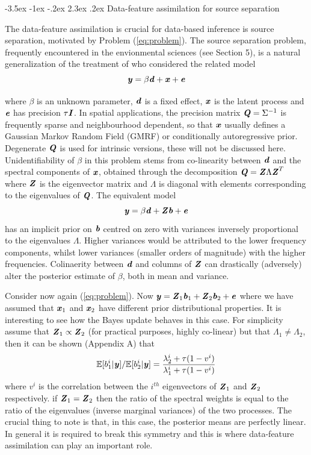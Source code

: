 \documentclass[10pt,a4paper]{article}
\makeatletter
\newcommand{\expect} {{\mathbb{E}}}
\newcommand{\Qmat} {\textbf{\textit{Q}}}
\newcommand{\Zmat} {\textbf{\textit{Z}}}
\newcommand{\Imat} {\textbf{\textit{I}}}
\newcommand{\bvec} {\textbf{\textit{b}}}
\newcommand{\dvec} {\textbf{\textit{d}}}
\newcommand{\evec} {\textbf{\textit{e}}}
\newcommand{\xvec} {\textbf{\textit{x}}}
\newcommand{\yvec} {\textbf{\textit{y}}}
\renewcommand\section{\@startsection{section}{1}{\z@}%
                                  {-3.5ex \@plus -1ex \@minus -.2ex}%
                                  {2.3ex \@plus.2ex}%
                                  {\normalfont\large\bfseries}}
\makeatother
\begin{document}
\section{Data-feature assimilation for source separation}

The data-feature assimilation is crucial for data-based inference is source separation, motivated by Problem (\ref{eq:problem}). The source separation problem, frequently encountered in the envionmental sciences (see Section 5), is a natural generalization of the treatment of \cite{Hodges_2010} who considered the related model
\begin{equation}\label{eq:problem}
\yvec = \beta \dvec + \xvec + \evec
\end{equation}

\noindent where $\beta$ is an unknown parameter, $\dvec$ is a fixed effect, $\xvec$ is the latent process and $\evec$ has precision $\tau\Imat$. In spatial applications, the precision matrix $\Qmat = \Sigma^{-1}$ is frequently sparse and neighbourhood dependent, so that $\xvec$ usually defines a Gaussian Markov Random Field (GMRF) or conditionally autoregressive prior. Degenerate $\Qmat$ is used for intrinsic versions, these will not be discussed here.  Unidentifiability of $\beta$ in this problem stems from co-linearity between $\dvec$ and the spectral components of $\xvec$, obtained through the decomposition $\Qmat = \Zmat \Lambda \Zmat^T$ where $\Zmat$ is the eigenvector matrix and $\Lambda$ is diagonal with elements corresponding to the eigenvalues of $\Qmat$. The equivalent model
\begin{equation}
\yvec = \beta \dvec + \Zmat \bvec + \evec
\end{equation}
has an implicit prior on $\bvec$ centred on zero with variances inversely proportional to the eigenvalues $\Lambda$. Higher variances would be attributed to the lower frequency components, whilst lower variances (smaller orders of magnitude) with the higher frequencies. Colinaerity between $\dvec$ and columns of $\Zmat$ can drastically (adversely) alter the posterior estimate of $\beta$, both in mean and variance. 

Consider now again (\ref{eq:problem}). Now $\yvec  = \Zmat_1 \bvec_1 + \Zmat_2 \bvec_2 + \evec$ where we have assumed that $\xvec_1$ and $\xvec_2$ have different prior distributional properties. It is interesting to see how the Bayes update behaves in this case. For simplicity assume that $\Zmat_1 \propto \Zmat_2$ (for practical purposes, highly co-linear) but that $\Lambda_1 \ne \Lambda_2$, then it can be shown (Appendix A) that 
\begin{equation}
\expect[b^i_1 | \yvec]/\expect[b^i_2 | \yvec] =\frac{\lambda^i_2 + \tau(1 - v^i)}{\lambda^i_1 + \tau(1- v^i)}
\end{equation}
\noindent where $v^i$ is the correlation between the $i^{th}$ eigenvectors of $\Zmat_1$ and $\Zmat_2$ respectively. if $\Zmat_1 = \Zmat_2$ then the ratio of the spectral weights is equal to the ratio of the eigenvalues (inverse marginal variances) of the two processes. The crucial thing to note is that, in this case, the posterior means are perfectly linear. In general it is required to break this symmetry and this is where data-feature assimilation can play an important role.
\end{document}
